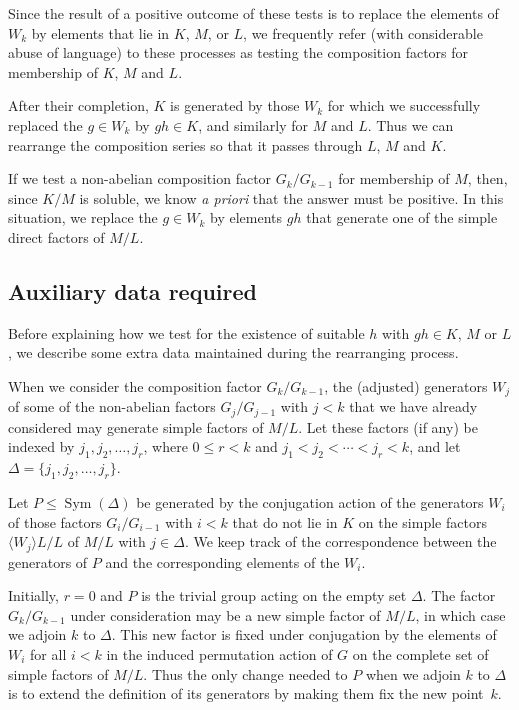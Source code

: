 \documentclass[12pt,twoside,reqno,psamsfonts]{amsproc}
\numberwithin{equation}{section}
\numberwithin{figure}{section}
\theoremstyle{plain}
\theoremstyle{definition}
\theoremstyle{remark}
\providecommand{\Sym}[1]{\operatorname{Sym}( #1 )}
\begin{document}
Since the result of a positive outcome of these tests is to replace the
elements of $W_k$ by elements that lie in $K$, $M$, or $L$, we 
frequently refer (with considerable abuse of language)
to these processes as testing the composition
factors for membership of $K$, $M$ and $L$.

After their completion, $K$ is generated by those $W_k$ for which we
successfully replaced the $g \in W_k$ by $gh \in K$,
and similarly for $M$ and $L$.  Thus we can 
rearrange the composition series so that it passes through $L$, $M$ and $K$.

If we test a non-abelian composition factor $G_k/G_{k-1}$ for membership of $M$,
then, since $K/M$ is soluble, we know {\it a priori} that the answer must be
positive. In this situation, we replace the $g \in W_k$ by elements
$gh$ that generate one of the simple direct factors of $M/L$. 

\subsection{Auxiliary data required}\label{auxil}
Before explaining how we test for the existence of suitable
$h$ with $gh \in K$, $M$ or $L$,
we describe some extra data maintained during the
rearranging process.

When we consider the composition factor $G_k/G_{k-1}$, the
(adjusted) generators $W_j$ of some of the non-abelian factors $G_j/G_{j-1}$
with $j<k$ that we have already considered may generate simple factors of $M/L$.
Let these factors (if any) be indexed by $j_1,j_2,\ldots,j_r$, where
$0 \leqslant r < k$ and $j_1<j_2< \cdots < j_r < k$, and let
$\Delta = \{j_1,j_2,\ldots,j_r\}$.

Let $P \leqslant \Sym{\Delta}$ be generated by the
conjugation action of the generators $W_i$ of those factors $G_i/G_{i-1}$ with
$i<k$ that do not lie in $K$ on the simple factors $\langle W_j \rangle L/L$ of
$M/L$ with $j \in \Delta$. We keep track of the correspondence
between the generators of $P$ and the corresponding elements 
of the $W_i$.

Initially, $r=0$ and $P$ is the trivial group acting on the empty
set $\Delta$. The factor $G_k/G_{k-1}$ under consideration may be a
new simple factor of $M/L$, in which case we adjoin $k$ to $\Delta$.
This new factor is fixed under conjugation  by
the elements of $W_i$ for all $i<k$ in the induced permutation action of $G$
on the complete set of simple factors of $M/L$.
Thus the only change needed to $P$ when we adjoin
$k$ to $\Delta$ is to extend the definition of its generators by making them
fix the new point~$k$.
\end{document}
